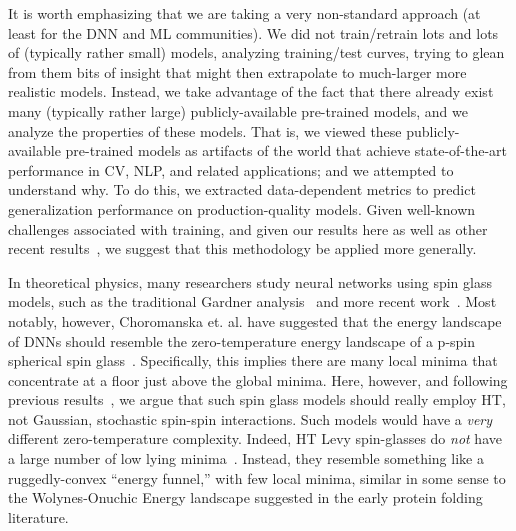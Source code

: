 It is worth emphasizing that we are taking a very non-standard approach (at least for the DNN and ML communities).
We did not train/retrain lots and lots of (typically rather small) models, analyzing training/test curves, trying to glean from them bits of insight that might then extrapolate to much-larger more realistic models.
Instead, we take advantage of the fact that there already exist many (typically rather large) publicly-available pre-trained models, and we analyze the properties of these models.
That is, we viewed these publicly-available pre-trained models as artifacts of the world that achieve state-of-the-art performance in CV, NLP, and related applications; and we attempted to understand why.
To do this, we extracted data-dependent metrics to predict generalization performance on production-quality models.
Given well-known challenges associated with training, and given our results here as well as other recent results~\cite{MM18_TR,MM19_HTSR_ICML},
we suggest that this methodology be applied more generally.

In theoretical physics, many researchers study neural networks using spin glass models, such as the traditional Gardner analysis~\cite{GD89,EB01_BOOK} and more recent work~\cite{PSG17_TR,PSG18_TR}.
Most notably, however, Choromanska et. al. have suggested that the energy landscape of DNNs should resemble the zero-temperature energy landscape of a p-spin spherical spin glass~\cite{CHMAx14_TR}.
Specifically, 
this implies 
there are many local minima that concentrate at a floor just above the global minima. 
Here, however, and following previous results~\cite{MM18_TR,MM19_HTSR_ICML}, we argue that such spin glass models should really employ HT, not Gaussian, stochastic spin-spin interactions.
Such models would have a \emph{very} different zero-temperature complexity. 
Indeed, HT Levy spin-glasses do \emph{not} have a large number of low lying minima~\cite{CB93,galluccio1998,GabKon99}.
Instead, they resemble something like a ruggedly-convex ``energy funnel,'' with few local minima, similar in some sense to the Wolynes-Onuchic Energy landscape \cite{wolynes_proteins_95,wolynes_arpc_97} suggested in the early protein folding literature.




